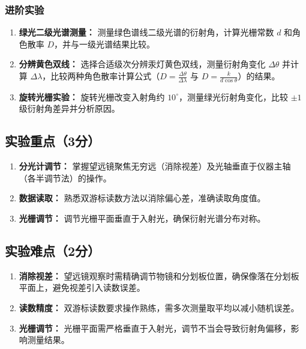\documentclass[]{../../templates/Report}%
\begin{document}
\subsubsection{进阶实验}
\begin{enumerate}
    \item \textbf{绿光二级光谱测量：} 测量绿色谱线二级光谱的衍射角，计算光栅常数 $d$ 和角色散率 $D$，并与一级光谱结果比较。
    \item \textbf{分辨黄色双线：} 选择合适级次分辨汞灯黄色双线，测量衍射角变化 $\Delta \theta$ 并计算 $\Delta \lambda$，比较两种角色散率计算公式（$D = \frac{\Delta \theta}{\Delta \lambda}$ 与 $D = \frac{k}{d \cos \theta}$）的结果。
    \item \textbf{旋转光栅实验：} 旋转光栅改变入射角约 $10^\circ$，测量绿光衍射角变化，比较 $\pm 1$ 级衍射角差异并分析原因。
\end{enumerate}

\subsection{实验重点（3分）}

\begin{enumerate}
    \item \textbf{分光计调节：} 掌握望远镜聚焦无穷远（消除视差）及光轴垂直于仪器主轴（各半调节法）的操作。
    \item \textbf{数据读取：} 熟悉双游标读数方法以消除偏心差，准确读取角度值。
    \item \textbf{光栅调节：} 调节光栅平面垂直于入射光，确保衍射光谱分布对称。
\end{enumerate}

\subsection{实验难点（2分）}
\begin{enumerate}
    \item \textbf{消除视差：} 望远镜观察时需精确调节物镜和分划板位置，确保像落在分划板平面上，避免视差引入读数误差。
    \item \textbf{读数精度：} 双游标读数要求操作熟练，需多次测量取平均以减小随机误差。
    \item \textbf{光栅调节：} 光栅平面需严格垂直于入射光，调节不当会导致衍射角偏移，影响测量结果。
\end{enumerate}
\end{document}
